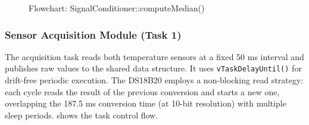 \begin{figure}[H]
\centering
{}
\caption{Flowchart: SignalConditioner::computeMedian()}
\label{fig:flowchart_compute_median}
\end{figure}

\subsubsection{Sensor Acquisition Module (Task 1)}

The acquisition task reads both temperature sensors at a fixed 50 ms interval and publishes raw values to the shared data structure. It uses \texttt{vTaskDelayUntil()} for drift-free periodic execution. The DS18B20 employs a non-blocking read strategy: each cycle reads the result of the previous conversion and starts a new one, overlapping the 187.5 ms conversion time (at 10-bit resolution) with multiple sleep periods.  shows the task control flow.

